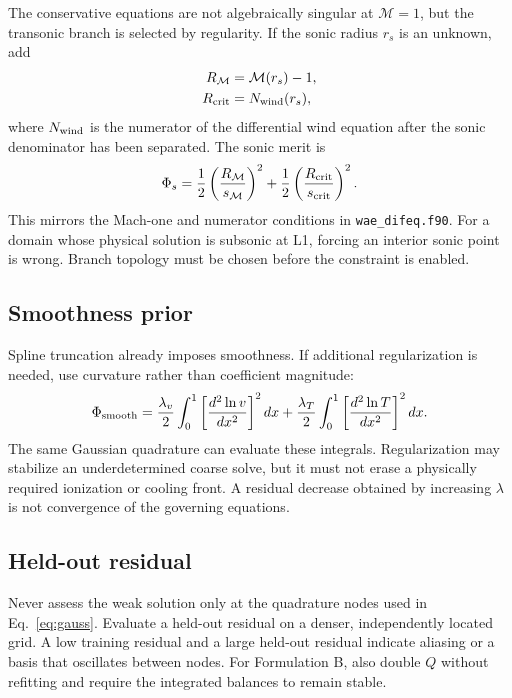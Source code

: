 \documentclass[english,a4paper]{my_memo}
\newcommand{\code}[1]{\texttt{#1}}
\newcommand{\Mach}{\mathcal{M}}
\begin{document}
The conservative equations are not algebraically singular at \(\Mach=1\), but
the transonic branch is selected by regularity.  If the sonic radius \(r_s\) is
an unknown, add
\begin{align}
 R_{\Mach} &= \Mach(r_s)-1,\\
 R_{\rm crit} &= N_{\rm wind}(r_s),
 \label{eq:sonicconditions}
\end{align}
where \(N_{\rm wind}\) is the numerator of the differential wind equation after
the sonic denominator has been separated.  The sonic merit is
\begin{equation}
 \Phi_s=\frac{1}{2}\left(\frac{R_{\Mach}}{s_{\Mach}}\right)^2
       +\frac{1}{2}\left(\frac{R_{\rm crit}}{s_{\rm crit}}\right)^2.
 \label{eq:sonicmerit}
\end{equation}
This mirrors the Mach-one and numerator conditions in
\code{wae\_difeq.f90}.  For a domain whose physical solution is subsonic at L1,
forcing an interior sonic point is wrong.  Branch topology must be chosen before
the constraint is enabled.

\subsection{Smoothness prior}

Spline truncation already imposes smoothness.  If additional regularization is
needed, use curvature rather than coefficient magnitude:
\begin{equation}
 \Phi_{\rm smooth}=\frac{\lambda_v}{2}
 \int_0^1\left[\frac{d^2\ln v}{dx^2}\right]^2dx
 +\frac{\lambda_T}{2}
 \int_0^1\left[\frac{d^2\ln T}{dx^2}\right]^2dx.
 \label{eq:smoothness}
\end{equation}
The same Gaussian quadrature can evaluate these integrals.  Regularization may
stabilize an underdetermined coarse solve, but it must not erase a physically
required ionization or cooling front.  A residual decrease obtained by
increasing \(\lambda\) is not convergence of the governing equations.

\subsection{Held-out residual}

Never assess the weak solution only at the quadrature nodes used in
Eq.~\eqref{eq:gauss}.  Evaluate a held-out residual on a denser, independently
located grid.  A low training residual and a large held-out residual indicate
aliasing or a basis that oscillates between nodes.  For Formulation B, also
double \(Q\) without refitting and require the integrated balances to remain
stable.
\end{document}
